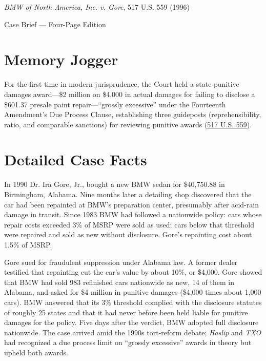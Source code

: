 \documentclass[12pt]{article}
\begin{document}
\begin{center}
{\LARGE \textit{BMW of North America, Inc. v. Gore}, 517 U.S. 559 (1996)\par}
\vspace{0.8em}
{\large Case Brief --- Four-Page Edition\par}
\end{center}
\vspace{1em}

\section{Memory Jogger}

For the first time in modern jurisprudence, the Court held a state punitive damages award---\$2 million on \$4,000 in actual damages for failing to disclose a \$601.37 presale paint repair---``grossly excessive'' under the Fourteenth Amendment's Due Process Clause, establishing three guideposts (reprehensibility, ratio, and comparable sanctions) for reviewing punitive awards (\href{https://www.courtlistener.com/opinion/118026/bmw-of-north-america-inc-v-gore/}{517 U.S. 559}).

\section{Detailed Case Facts}

In 1990 Dr. Ira Gore, Jr., bought a new BMW sedan for \$40,750.88 in Birmingham, Alabama. Nine months later a detailing shop discovered that the car had been repainted at BMW's preparation center, presumably after acid-rain damage in transit. Since 1983 BMW had followed a nationwide policy: cars whose repair costs exceeded 3\% of MSRP were sold as used; cars below that threshold were repaired and sold as new without disclosure. Gore's repainting cost about 1.5\% of MSRP.

Gore sued for fraudulent suppression under Alabama law. A former dealer testified that repainting cut the car's value by about 10\%, or \$4,000. Gore showed that BMW had sold 983 refinished cars nationwide as new, 14 of them in Alabama, and asked for \$4 million in punitive damages (\$4,000 times about 1,000 cars). BMW answered that its 3\% threshold complied with the disclosure statutes of roughly 25 states and that it had never before been held liable for punitive damages for the policy. Five days after the verdict, BMW adopted full disclosure nationwide. The case arrived amid the 1990s tort-reform debate; \textit{Haslip} and \textit{TXO} had recognized a due process limit on ``grossly excessive'' awards in theory but upheld both awards.
\end{document}
